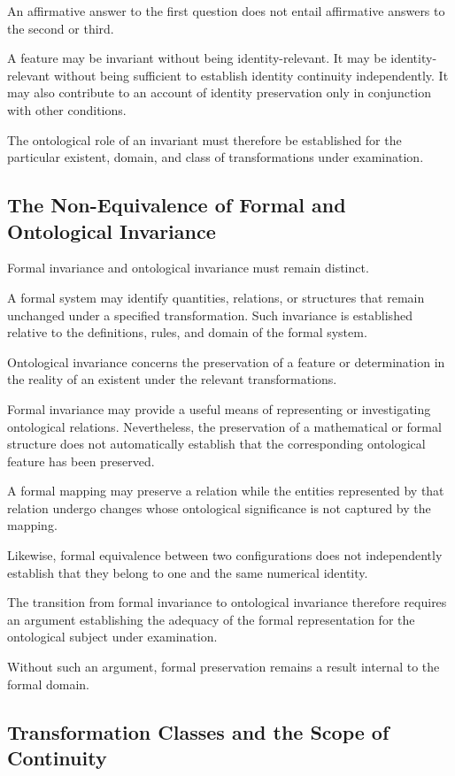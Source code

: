 An affirmative answer to the first question does
not entail affirmative answers to the second or third.

A feature may be invariant without being identity-relevant.
It may be identity-relevant without being sufficient
to establish identity continuity independently.
It may also contribute to an account of identity
preservation only in conjunction with other conditions.

The ontological role of an invariant must therefore
be established for the particular existent, domain,
and class of transformations under examination.

\subsection{The Non-Equivalence of Formal and Ontological Invariance}

Formal invariance and ontological invariance must
remain distinct.

A formal system may identify quantities, relations,
or structures that remain unchanged under a specified
transformation. Such invariance is established relative
to the definitions, rules, and domain of the formal
system.

Ontological invariance concerns the preservation of
a feature or determination in the reality of an existent
under the relevant transformations.

Formal invariance may provide a useful means of
representing or investigating ontological relations.
Nevertheless, the preservation of a mathematical
or formal structure does not automatically establish
that the corresponding ontological feature has been
preserved.

A formal mapping may preserve a relation while the
entities represented by that relation undergo changes
whose ontological significance is not captured by
the mapping.

Likewise, formal equivalence between two configurations
does not independently establish that they belong
to one and the same numerical identity.

The transition from formal invariance to ontological
invariance therefore requires an argument establishing
the adequacy of the formal representation for the
ontological subject under examination.

Without such an argument, formal preservation remains
a result internal to the formal domain.

\subsection{Transformation Classes and the Scope of Continuity}


